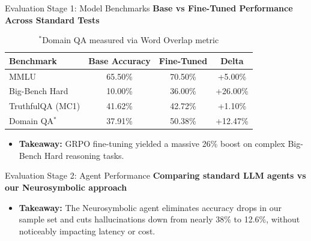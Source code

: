 \documentclass{beamer}
\begin{document}
\begin{frame}{Evaluation Stage 1: Model Benchmarks}
    \textbf{Base vs Fine-Tuned Performance Across Standard Tests}
    
    \vspace{0.3cm}
    \begin{table}[]
        \centering
        \begin{tabular}{lccc}
            \toprule
            \textbf{Benchmark} & \textbf{Base Accuracy} & \textbf{Fine-Tuned} & \textbf{Delta} \\
            \midrule
            MMLU & 65.50\% & 70.50\% & \textcolor{green!60!black}{+5.00\%} \\
            Big-Bench Hard & 10.00\% & 36.00\% & \textcolor{green!60!black}{+26.00\%} \\
            TruthfulQA (MC1) & 41.62\% & 42.72\% & \textcolor{green!60!black}{+1.10\%} \\
            Domain QA$^*$ & 37.91\% & 50.38\% & \textcolor{green!60!black}{+12.47\%} \\
            \bottomrule
        \end{tabular}
        \vspace{0.1cm}
        \caption*{$^*$Domain QA measured via Word Overlap metric}
    \end{table}
    \begin{itemize}
        \item \textbf{Takeaway:} GRPO fine-tuning yielded a massive 26\% boost on complex Big-Bench Hard reasoning tasks.
    \end{itemize}
\end{frame}

\begin{frame}{Evaluation Stage 2: Agent Performance}
    \textbf{Comparing standard LLM agents vs our Neurosymbolic approach}
    
    \vspace{0.3cm}
    \begin{table}[]
        \centering
    \end{table}
    \begin{itemize}
        \item \textbf{Takeaway:} The Neurosymbolic agent eliminates accuracy drops in our sample set and cuts hallucinations down from nearly 38\% to 12.6\%, without noticeably impacting latency or cost.
    \end{itemize}
\end{frame}
\end{document}
